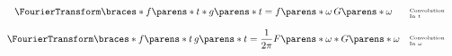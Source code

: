 \begin{multicols}{2}
\begin{CheatsheetEntryFrame}
\begin{equation*}
\begin{array}{cl}
                \\[1.2em]
                \FourierTransform\braces*{f\parens*{t} * g\parens*{t}}
                = f\parens*{\omega} \, G\parens*{\omega}
                & \text{\tiny\parbox{6em}{Convolution\\In $t$}}
                \\[1.2em]
                {\displaystyle
                    \FourierTransform\braces*{f\parens*{t} \, g\parens*{t}}
                    = \frac{1}{2 \pi} F\parens*{\omega} * G\parens*{\omega}
                }
                & \text{\tiny\parbox{6em}{Convolution\\In $\omega$}}
            \end{array}
        \end{equation*}

    \end{CheatsheetEntryFrame}

    \begin{CheatsheetEntryFrame}


\end{CheatsheetEntryFrame}
\end{multicols}
